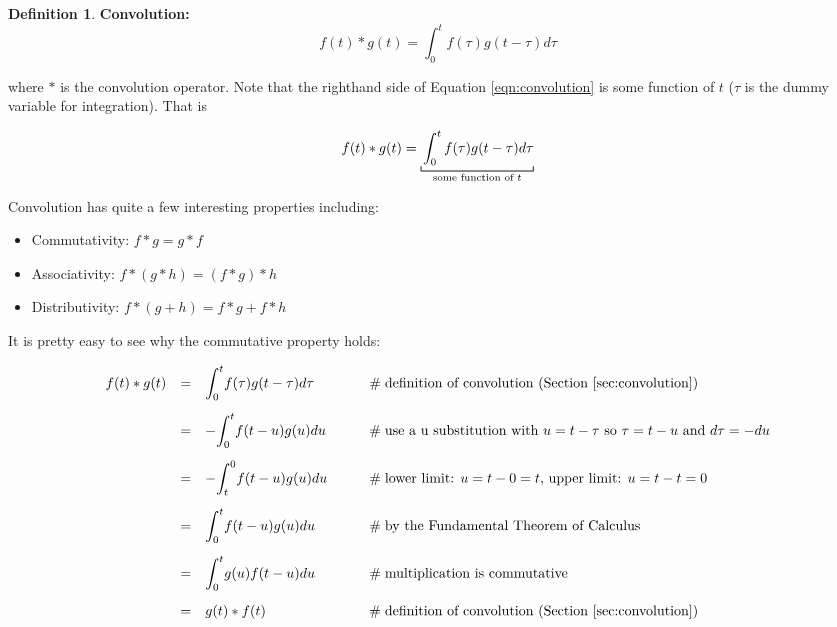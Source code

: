 \documentclass{article}
\theoremstyle{definition}
\newtheorem{definition}{Definition}[section]
\begin{document}
\bigskip
\begin{definition} {\bf Convolution:}
\bigskip
\begin{equation}
f(t) \ast g(t) = \int^t_0 f(\tau) g(t - \tau) d\tau
\label{eqn:convolution}
\end{equation}
\label{def:convolution}
\end{definition}

\noindent
where $\ast$ is the convolution operator. Note that the righthand side of Equation \ref{eqn:convolution} is some function of $t$ ($\tau$ is the dummy variable 
for integration). That is

\bigskip
\begin{equation*}
f(t) \ast g(t) = \underbracket [0.15 ex] {\strut \int^t_0 f(\tau) g(t - \tau) d\tau}_{\text{some function of } t}
\end{equation*}

\bigskip
\noindent
Convolution has quite a few interesting properties including:

\bigskip
 \begin{itemize}
 \item Commutativity: $f \ast g = g \ast f$ 
 \item Associativity: $f \ast (g \ast h) = (f \ast g) \ast h$
 \item Distributivity:  $f \ast (g + h) = f \ast g + f \ast h$
\end{itemize}

\bigskip
\noindent
It is pretty easy to see why the commutative property holds:

\begin{equation*}
\begin{array}{lllll}
f(t) \ast g(t)                                                                                                                          
&=& \mathlarger{\int}^t_0 f(\tau) g(t - \tau) d\tau                  &\qquad \mathrel{\#} \text{definition of convolution (Section \ref{sec:convolution})}                                 \\
[15pt]
&=& -\mathlarger{\int}^t_0 f(t -u) g(u) du                              &\qquad \mathrel{\#} \text{use a u substitution with $u = t - \tau$ so $\tau = t -u$ and $d\tau = -du$}     \\
[15pt]
&=& - \mathlarger{\int}^0_t f(t -u) g(u) du                             &\qquad \mathrel{\#} \text{lower limit: $u = t - 0 = t$, upper limit: $u = t - t = 0$}                                     \\
[15pt]
&=& \mathlarger{\int}^t_0 f(t -u) g(u) du                               &\qquad \mathrel{\#} \text{by the Fundamental Theorem of Calculus}                                                      \\
[15pt]
&=& \mathlarger{\int}^t_0 g(u) f(t -u) du                               &\qquad \mathrel{\#} \text{multiplication is commutative}                                                                          \\
[15pt]
&=& g(t) \ast f(t)                                                                    &\qquad \mathrel{\#} \text{definition of convolution (Section \ref{sec:convolution})}
\end{array}
\end{equation*}
\end{document}

